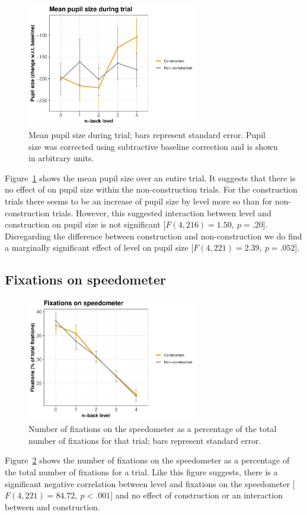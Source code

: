 \begin{figure}
  \centering
  \includegraphics[width=7.5cm]{images/pupil_size_interaction.pdf}
  \caption{Mean pupil size during trial; bars represent standard error.
  Pupil size was corrected using subtractive baseline correction and is shown in arbitrary units.}
  \label{fig:mean-ps}
\end{figure}

Figure~\ref{fig:mean-ps} shows the mean pupil size over an entire trial. 
It suggests that there is no effect of \nback on pupil size within the non-construction trials.
For the construction trials there seems to be an increase of pupil size by \nback level more so than for non-construction trials.
However, this suggested interaction between \nback level and construction on pupil size is not significant [\(F(4,216)=1.50,\ p=.20\)].
Disregarding the difference between construction and non-construction we do find a marginally significant effect of \nback level on pupil size [\(F(4,221)=2.39,\ p=.052\)].

\subsection{Fixations on speedometer}

\begin{figure}
  \centering
  \includegraphics[width=7.5cm]{images/speedometer_interaction.pdf}
  \caption{Number of fixations on the speedometer as a percentage of the total number of fixations for that trial; bars represent standard error.}
  \label{fig:fix-speedometer}
\end{figure}

Figure~\ref{fig:fix-speedometer} shows the number of fixations on the speedometer as a percentage of the total number of fixations for a trial.
Like this figure suggests, there is a significant negative correlation between \nback level and fixations on the speedometer [\(F(4,221)=84.72,\ p<.001\)] and no effect of construction or an interaction between \nback and construction. 